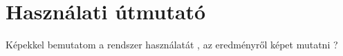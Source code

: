
\chapter{Használati útmutató}

Képekkel bemutatom a rendszer használatát , az eredményről képet mutatni ?